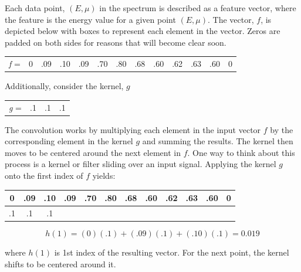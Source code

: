 \noindent Each data point, $ (E, \mu) $ in the spectrum is described as a feature vector, where the feature is the energy value for a given point $ (E, \mu) $. The vector, $ f $,  is depicted below with boxes to represent each element in the vector. Zeros are padded on both sides for reasons that will become clear soon. 

\begin{table}[h!]
    \centering
    \begin{tabular}{c|c|c|c|c|c|c|c|c|c|c|c|c|}
    \cline{2-13}
    \textit{f} = & 0 & .09 & .10 & .09 & .70 & .80 & .68 & .60 & .62 & .63 & .60 & 0 \\ \cline{2-13}
    \end{tabular}
\end{table}

\noindent Additionally, consider the kernel, $ g $  

\begin{table}[h!]
\centering
    \begin{tabular}{lccc}
    \cline{2-4}
    \multicolumn{1}{l|}{\textit{g} =} & \multicolumn{1}{c|}{.1} & \multicolumn{1}{c|}{.1} & \multicolumn{1}{c|}{.1} \\ \cline{2-4}                 
    \end{tabular}
\end{table}

\noindent The convolution works by multiplying each element in the input vector $ f $ by the corresponding element in the kernel $ g $ and summing the results. The kernel then moves to be centered around the next element in $ f $. One way to think about this process is a kernel or filter sliding over an input signal. Applying the kernel $ g $ onto the first index of $ f $ yields: 

\begin{table}[h!]
    \centering
    \begin{tabular}{|c|c|c|c|c|c|c|c|c|c|c|c|}
    \hline
    0  & .09 & .10 & .09 & .70 & \multicolumn{1}{c|}{.80} & \multicolumn{1}{c|}{.68} & \multicolumn{1}{c|}{.60} & .62 & .63 & .60 & 0 \\ \hline
    .1 & .1  & .1  &     &     &                          &                          &                          &     &     &     &   \\ \hline
    \end{tabular}
\end{table}
$$ 
h(1) = (0)(.1) + (.09)(.1) + (.10)(.1) = 0.019
$$

\noindent where $ h(1) $ is 1st index of the resulting vector. For the next point, the kernel shifts to be centered around it. 

